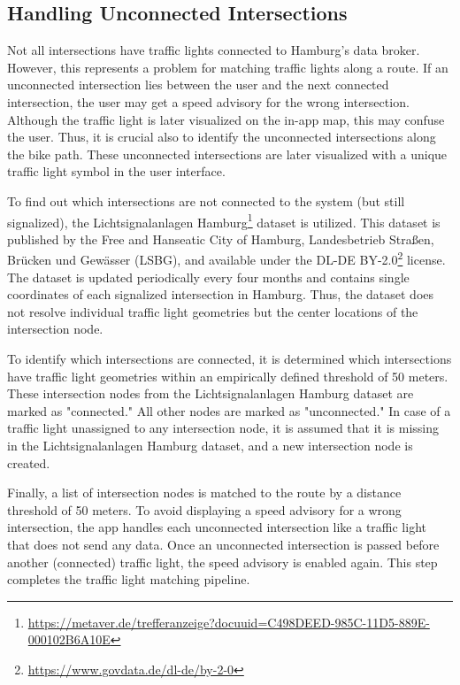 \subsection{Handling Unconnected Intersections}

Not all intersections have traffic lights connected to Hamburg's data broker. However, this represents a problem for matching traffic lights along a route. If an unconnected intersection lies between the user and the next connected intersection, the user may get a speed advisory for the wrong intersection. Although the traffic light is later visualized on the in-app map, this may confuse the user. Thus, it is crucial also to identify the unconnected intersections along the bike path. These unconnected intersections are later visualized with a unique traffic light symbol in the user interface.

To find out which intersections are not connected to the system (but still signalized), the Lichtsignalanlagen Hamburg\footnote{\url{https://metaver.de/trefferanzeige?docuuid=C498DEED-985C-11D5-889E-000102B6A10E}} dataset is utilized. This dataset is published by the Free and Hanseatic City of Hamburg, Landesbetrieb Straßen, Brücken und Gewässer (LSBG), and available under the DL-DE BY-2.0\footnote{\url{https://www.govdata.de/dl-de/by-2-0}} license. The dataset is updated periodically every four months and contains single coordinates of each signalized intersection in Hamburg. Thus, the dataset does not resolve individual traffic light geometries but the center locations of the intersection node. 

To identify which intersections are connected, it is determined which intersections have traffic light geometries within an empirically defined threshold of 50 meters. These intersection nodes from the Lichtsignalanlagen Hamburg dataset are marked as "connected." All other nodes are marked as "unconnected." In case of a traffic light unassigned to any intersection node, it is assumed that it is missing in the Lichtsignalanlagen Hamburg dataset, and a new intersection node is created. 

Finally, a list of intersection nodes is matched to the route by a distance threshold of 50 meters. To avoid displaying a speed advisory for a wrong intersection, the app handles each unconnected intersection like a traffic light that does not send any data. Once an unconnected intersection is passed before another (connected) traffic light, the speed advisory is enabled again. This step completes the traffic light matching pipeline.

